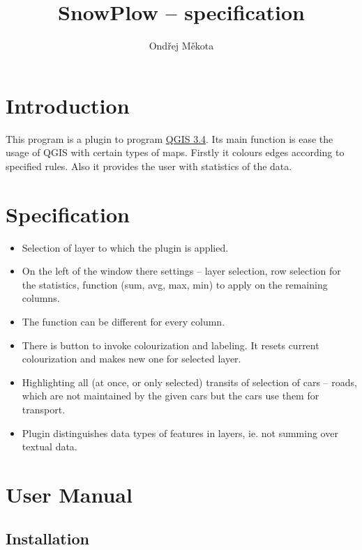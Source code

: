 \documentclass[12pt,a4paper]{article}
\begin{document}
\title{SnowPlow – specification}
\author{Ondřej Měkota}

\maketitle
\section{Introduction}

\par This program is a plugin to program \href{https://qgis.org/en/site/index.html}{QGIS 3.4}. 
Its main function is ease the usage of QGIS with certain types of maps.
Firstly it colours edges according to specified rules.
Also it provides the user with statistics of the data.


\section{Specification}
\begin{itemize}
    \item Selection of layer to which the plugin is applied.
    \item On the left of the window there settings – layer selection, row selection for the statistics, function (sum, avg, max, min) to apply on the remaining columns.
    \item The function can be different for every column.
    \item There is button to invoke colourization and labeling. It resets current colourization and makes new one for selected layer.
    \item Highlighting all (at once, or only selected) transits of selection of cars – roads, which are not maintained by the given cars but the cars use them for transport. 
    \item Plugin distinguishes data types of features in layers, ie. not summing over textual data. 
\end{itemize}

\section{User Manual}
\subsection{Installation}
\end{document}
